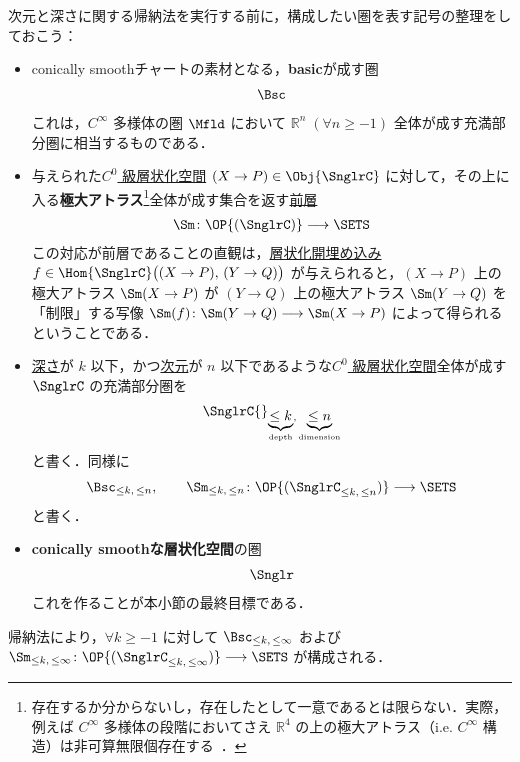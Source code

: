 \documentclass[TQFT_main]{subfiles}
\begin{document}
次元と深さに関する帰納法を実行する前に，構成したい圏を表す記号の整理をしておこう：
\begin{itemize}
    \item conically smoothチャートの素材となる，\textbf{basic}が成す圏
    \begin{align}
        \Bsc    
    \end{align}
    これは，$C^\infty$ 多様体の圏 $\Mfld$ において $\mathbb{R}^n\; (\forall n \ge -1)$ 全体が成す充満部分圏に相当するものである．
    
    \item 与えられた\hyperref[def:Snglr-C0]{$C^0$ 級層状化空間} $(X \to P) \in \Obj{\SnglrC}$ に対して，その上に入る\textbf{極大アトラス}\footnote{存在するか分からないし，存在したとして一意であるとは限らない．実際，例えば $C^\infty$ 多様体の段階においてさえ $\mathbb{R}^4$ の上の極大アトラス（i.e. $C^\infty$ 構造）は非可算無限個存在する~\cite{taubes1987gauge}．}全体が成す集合を返す\hyperref[def:presheaf]{前層}
    \begin{align}
        \Sm \colon \OP{(\SnglrC)} \lto \SETS
    \end{align}
    この対応が前層であることの直観は，\hyperref[def:strat-emb]{層状化開埋め込み} $f \in \Hom{\SnglrC} \bigl((X \to P),\, (Y \to Q)\bigr)$ が与えられると，$(X \to P)$ 上の極大アトラス $\Sm(X \to P)$ が $(Y \to Q)$ 上の極大アトラス $\Sm(Y \to Q)$ を「制限」する写像 $\Sm(f) \colon \Sm(Y \to Q) \lto \Sm(X \to P)$ によって得られるということである．
    
    \item \hyperref[def:dim-depth]{深さ}が $k$ 以下，かつ\hyperref[def:dim-depth]{次元}が $n$ 以下であるような\hyperref[def:Snglr-C0]{$C^0$ 級層状化空間}全体が成す $\SnglrC$ の充満部分圏を
    \begin{align}
        \SnglrC{}_{\underbrace{\le k}_{\text{depth}},\, \underbrace{\le n}_{\text{dimension}}}
    \end{align}
    と書く．同様に
    \begin{align}
        \Bsc_{\le k,\, \le n},\qquad \Sm_{\le k,\, \le n} \colon \OP{(\SnglrC_{\le k,\, \le n})} \lto \SETS
    \end{align}
    と書く．
    
    \item \textbf{conically smoothな層状化空間}の圏
    \begin{align}
        \Snglr
    \end{align}
    これを作ることが本小節の最終目標である．
\end{itemize}
帰納法により，$\forall k \ge -1$ に対して $\Bsc_{\le k,\, \le \infty}$ および $\Sm_{\le k,\, \le \infty} \colon \OP{(\SnglrC_{\le k,\, \le \infty})} \lto \SETS$ が構成される．
\end{document}
